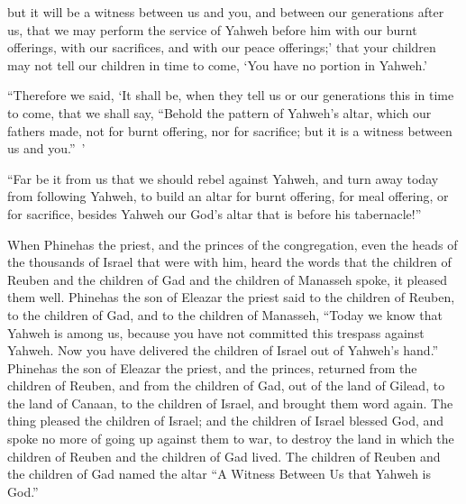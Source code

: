 {but it will be a witness between us and you, and between our generations after us, that we may perform the service of Yahweh before him with our burnt offerings, with our sacrifices, and with our peace offerings;’ that your children may not tell our children in time to come, ‘You have no portion in Yahweh.’
\par }{\PP {}“Therefore we said, ‘It shall be, when they tell us or our generations this in time to come, that we shall say, “Behold the pattern of Yahweh’s altar, which our fathers made, not for burnt offering, nor for sacrifice; but it is a witness between us and you.” ’
\par }{\PP {}“Far be it from us that we should rebel against Yahweh, and turn away today from following Yahweh, to build an altar for burnt offering, for meal offering, or for sacrifice, besides Yahweh our God’s altar that is before his tabernacle!”
\par }{\PP {}When Phinehas the priest, and the princes of the congregation, even the heads of the thousands of Israel that were with him, heard the words that the children of Reuben and the children of Gad and the children of Manasseh spoke, it pleased them well.
Phinehas the son of Eleazar the priest said to the children of Reuben, to the children of Gad, and to the children of Manasseh, “Today we know that Yahweh is among us, because you have not committed this trespass against Yahweh. Now you have delivered the children of Israel out of Yahweh’s hand.”
Phinehas the son of Eleazar the priest, and the princes, returned from the children of Reuben, and from the children of Gad, out of the land of Gilead, to the land of Canaan, to the children of Israel, and brought them word again.
The thing pleased the children of Israel; and the children of Israel blessed God, and spoke no more of going up against them to war, to destroy the land in which the children of Reuben and the children of Gad lived.
The children of Reuben and the children of Gad named the altar “A Witness Between Us that Yahweh is God.”

}
